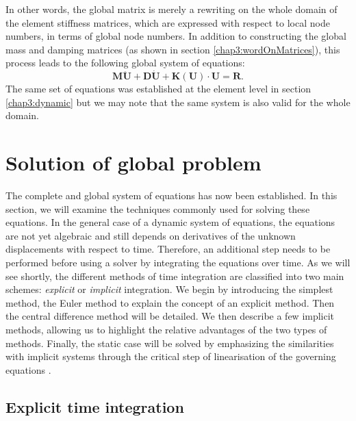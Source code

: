 In other words, the global matrix is merely a rewriting on the whole domain of the element stiffness matrices, which are expressed with respect to local node numbers, in terms of global node numbers. In addition to constructing the global mass and damping matrices (as shown in section \ref{chap3:wordOnMatrices}), this process leads to the following global system of equations:
\begin{equation}
\label{chap3:dynamic2}
\mathbf{M} \mathbf{\ddot U} + \mathbf{D} \mathbf{ \dot U} + \mathbf{K}(\mathbf{U}) \cdot \mathbf{U} = \mathbf{R}.
\end{equation}	
The same set of equations was established at the element level in section \ref{chap3:dynamic} but we may note that the same system is also valid for the whole domain. 


\section{Solution of global problem}
The complete and global system of equations has now been established. In this section, we will examine the techniques commonly used for solving these equations. In the general case of a dynamic system of equations, the equations are not yet algebraic and still depends on derivatives of the unknown displacements with respect to time. Therefore, an additional step needs to be performed before using a solver by integrating the equations over time. As we will see shortly, the different methods of time integration are classified into two main schemes: \emph{explicit} or \emph{implicit} integration. We begin by introducing the simplest method, the Euler method to explain the concept of an explicit method. Then the central difference method will be detailed. We then describe a few implicit methods, allowing us to highlight the relative advantages of the two types of methods. Finally, the static case will be solved by emphasizing the similarities with implicit systems through the critical step of linearisation of the governing equations \citep{Belytschko00}.

	\subsection{Explicit time integration}

